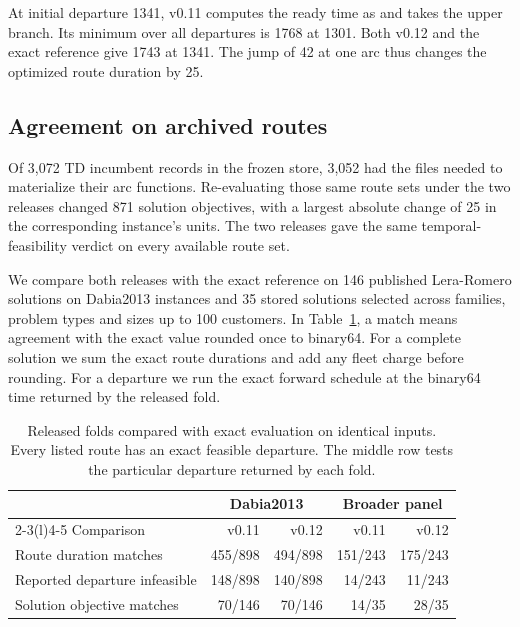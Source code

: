 At initial departure 1341, v0.11 computes the ready time as  and takes the upper branch. Its minimum over all departures is 1768 at 1301. Both v0.12 and the exact reference give 1743 at 1341. The jump of 42 at one arc thus changes the optimized route duration by 25.

\FloatBarrier
\subsection{Agreement on archived routes}

Of 3,072 TD incumbent records in the frozen store, 3,052 had the files needed to materialize their arc functions. Re-evaluating those same route sets under the two releases changed 871 solution objectives, with a largest absolute change of 25 in the corresponding instance's units. The two releases gave the same temporal-feasibility verdict on every available route set.

We compare both releases with the exact reference on 146 published Lera-Romero solutions on Dabia2013 instances and 35 stored solutions selected across families, problem types and sizes up to 100 customers. In Table~\ref{tab:td-release-agreement}, a match means agreement with the exact value rounded once to binary64. For a complete solution we sum the exact route durations and add any fleet charge before rounding. For a departure we run the exact forward schedule at the binary64 time returned by the released fold.

\begin{table}[htbp]
\centering
\small
\begin{tabular}{@{}lrrrr@{}}
\toprule
& \multicolumn{2}{c}{Dabia2013} & \multicolumn{2}{c}{Broader panel}\\
\cmidrule(lr){2-3}\cmidrule(l){4-5}
Comparison & v0.11 & v0.12 & v0.11 & v0.12\\
\midrule
Route duration matches & 455/898 & 494/898 & 151/243 & 175/243\\
Reported departure infeasible & 148/898 & 140/898 & 14/243 & 11/243\\
Solution objective matches & 70/146 & 70/146 & 14/35 & 28/35\\
\bottomrule
\end{tabular}
\caption{Released folds compared with exact evaluation on identical inputs. Every listed route has an exact feasible departure. The middle row tests the particular departure returned by each fold.}\label{tab:td-release-agreement}
\end{table}


